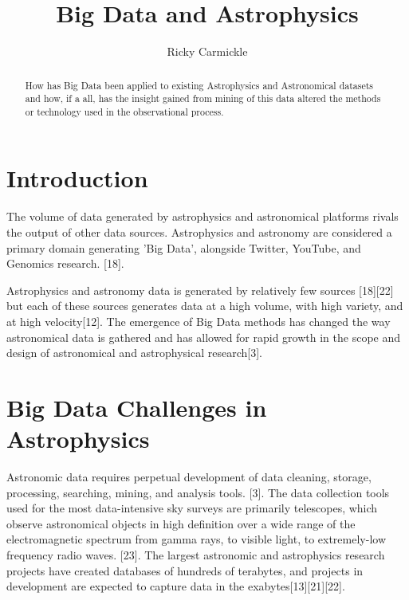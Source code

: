 \documentclass[sigconf]{acmart}
\begin{document}
\title{Big Data and Astrophysics}


\author{Ricky Carmickle}


\maketitle

\begin{abstract}

How has Big Data been applied to existing Astrophysics and Astronomical datasets and how, if a all, has the insight gained from mining of this data altered the methods or technology used in the observational process.

\end{abstract}


\section{Introduction}
The volume of data generated by astrophysics and astronomical platforms rivals the output of other data sources. Astrophysics and astronomy are considered a primary domain generating 'Big Data', alongside Twitter, YouTube, and Genomics research. [18]. 

Astrophysics and astronomy data is generated by relatively few sources [18][22] but each of these sources generates data at a high volume, with high variety, and at high velocity[12]. The emergence of Big Data methods has changed the way astronomical data is gathered and has allowed for rapid growth in the scope and design of astronomical and astrophysical research[3]. 

\section{Big Data Challenges in Astrophysics}
Astronomic data requires perpetual development of data cleaning, storage, processing, searching, mining, and analysis tools. [3]. The data collection tools used for the most data-intensive sky surveys are primarily telescopes, which observe astronomical objects in high definition over a wide range of the electromagnetic spectrum from gamma rays, to visible light, to extremely-low frequency radio waves. [23]. The largest astronomic and astrophysics research projects have created databases of hundreds of terabytes, and projects in development are expected to capture data in the exabytes[13][21][22]. \\
\end{document}
